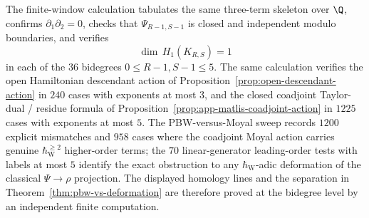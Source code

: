 \begin{rmk}
\label{rmk:app-full-psi-numerical-anchor}
  The finite-window calculation tabulates the same three-term skeleton
  over \(\Q\), confirms
  \(\partial_1\partial_2=0\), checks that \(\Psi_{R-1,S-1}\) is closed
  and independent modulo boundaries, and verifies
  \[
    \dim\,H_1(K_{R,S})=1
  \]
  in each of the \(36\) bidegrees \(0\leq R-1,S-1\leq5\).  The same
  calculation verifies the open Hamiltonian descendant action of
  Proposition~\ref{prop:open-descendant-action} in \(240\) cases with
  exponents at most \(3\), and the closed coadjoint Taylor-dual / residue
  formula of Proposition~\ref{prop:app-matlis-coadjoint-action} in
  \(1225\) cases with exponents at most \(5\).  The
  PBW-versus-Moyal sweep records \(1200\) explicit mismatches and
  \(958\) cases where the coadjoint Moyal action carries genuine
  \(\hbar_{\mathrm{W}}^{\geq2}\) higher-order terms; the \(70\) linear-generator
  leading-order tests with labels at most \(5\) identify the exact obstruction
  to any \(\hbar_{\mathrm{W}}\)-adic deformation of the classical
  \(\Psi\to\rho\) projection.  The displayed homology lines and the
  separation in
  Theorem~\ref{thm:pbw-vs-deformation} are therefore proved at the
  bidegree level by an independent finite computation.
\end{rmk}


